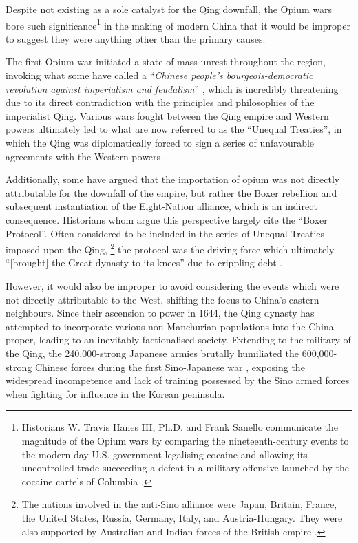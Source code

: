 \documentclass{article}
\begin{document}
Despite not existing as a sole catalyst for the Qing downfall, the Opium wars bore such significance\footnote{Historians W. Travis Hanes III, Ph.D. and Frank Sanello communicate the magnitude of the Opium wars by comparing the nineteenth-century events to the modern-day U.S. government legalising cocaine and allowing its uncontrolled trade succeeding a defeat in a military offensive launched by the cocaine cartels of Columbia
\autocite{Hanes:2004}.} in the making of modern China that it would be improper to suggest they were anything other than the primary causes.

The first Opium war initiated a state of mass-unrest throughout the region, invoking what some have called a ``\textit{Chinese people's bourgeois-democratic revolution against imperialism and feudalism}''
\autocite{Janin:1999}, which is incredibly threatening due to its direct contradiction with the principles and philosophies of the imperialist Qing. Various wars fought between the Qing empire and Western powers ultimately led to what are now referred to as the ``Unequal Treaties'', in which the Qing was diplomatically forced to sign a series of unfavourable agreements with the Western powers \autocite{Wang:2005}.

Additionally, some have argued that the importation of opium was not directly attributable for the downfall of the empire, but rather the Boxer rebellion and subsequent instantiation of the Eight-Nation alliance, which is an indirect consequence. Historians whom argue this perspective largely cite the ``Boxer Protocol''. Often considered to be included in the series of Unequal Treaties imposed upon the Qing, \footnote{The nations involved in the anti-Sino alliance were Japan, Britain, France, the United States, Russia, Germany, Italy, and Austria-Hungary. They were also supported by Australian and Indian forces of the British empire
\autocite{Gardener:2016}.} the protocol was the driving force which ultimately ``[brought] the Great dynasty to its knees'' due to crippling debt \autocite{Mitchell:2008}.

However, it would also be improper to avoid considering the events which were not directly attributable to the West, shifting the focus to China's eastern neighbours. Since their ascension to power in 1644, the Qing dynasty has attempted to incorporate various non-Manchurian populations into the China proper, leading to an inevitably-factionalised society. Extending to the military of the Qing, the 240,000-strong Japanese armies brutally humiliated the 600,000-strong Chinese forces during the first Sino-Japanese war
\autocite{Fenby:2013}, exposing the widespread incompetence and lack of training possessed by the Sino armed forces
\autocite{Jowett:2013} when fighting for influence in the Korean peninsula.
\end{document}
